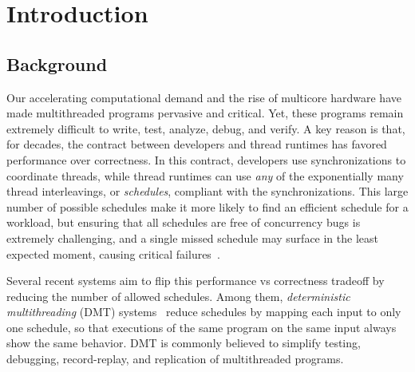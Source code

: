 \section{Introduction} \label{sec:intro}
\subsection{Background}

Our accelerating computational demand and the rise of multicore hardware
have made multithreaded programs pervasive and critical.  Yet,
these programs remain extremely difficult to write, test, analyze, debug,
and verify.  A key reason is that, for decades, the contract between
developers and thread runtimes has favored performance over
correctness.  In this contract, developers use 
synchronizations to coordinate threads, while thread runtimes can
use \emph{any} of the exponentially many thread interleavings, or \emph{schedules}, compliant
with the synchronizations.  This large number of possible schedules make it
more likely to find an efficient schedule for a workload, but ensuring
that all schedules are free of concurrency bugs is extremely
challenging, and a single missed schedule may surface in the least
expected moment, causing critical
failures~\cite{therac25-investigation, northeast-blackout,
  lu:concurrency-bugs,con:hotpar12}.



Several recent systems aim to flip this performance vs correctness tradeoff
by reducing the number of allowed schedules.  Among them,
\emph{deterministic multithreading} (DMT)
systems~\cite{coredet:asplos10,dmp:asplos09, kendo:asplos09,
  grace:oopsla09, cui:tern:osdi10, dthreads:sosp11, determinator:osdi10,
  peregrine:sosp11, bergan:oopsla13} reduce schedules by mapping each input to only one
schedule, so that executions of the same program on the same input always
show the same behavior. DMT is commonly believed to simplify testing,
debugging, record-replay, and replication of multithreaded programs.

